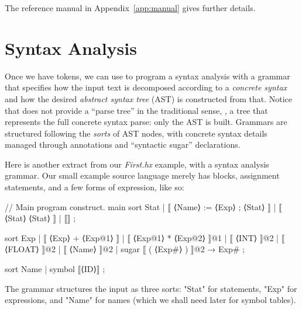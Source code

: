\documentclass[11pt]{article} %
\begin{document}
The reference manual in Appendix~\ref{app:manual} gives further details.


\section{Syntax Analysis}
\label{sec:syntax}

Once we have tokens, we can use \HAX to program a syntax analysis with a grammar that specifies how
the input text is decomposed according to a \emph{concrete syntax} and how the desired
\emph{abstract syntax tree} (AST) is constructed from that. Notice that \HAX does not provide a
``parse tree'' in the traditional sense, \ie, a tree that represents the full concrete syntax parse:
only the AST is built.  Grammars are structured following the \emph{sorts} of AST nodes, with
concrete syntax details managed through annotations and ``syntactic sugar'' declarations.

\begin{example}\label{ex:syntax}
  Here is another extract from our \emph{First.hx} example, with a syntax analysis grammar. Our
  small example source language merely has blocks, assignment statements, and a few forms of
  expression, like so:
\begin{hacs}[xleftmargin=\parindent,xrightmargin=\parindent,numbers=right]
// Main program construct.
main sort Stat  | ⟦ ⟨Name⟩ := ⟨Exp⟩ ; ⟨Stat⟩ ⟧
                | ⟦ { ⟨Stat⟩ } ⟨Stat⟩ ⟧
                | ⟦⟧ ;

sort Exp  | ⟦ ⟨Exp⟩ + ⟨Exp@1⟩ ⟧
          | ⟦ ⟨Exp@1⟩ * ⟨Exp@2⟩ ⟧@1
          | ⟦ ⟨INT⟩ ⟧@2
          | ⟦ ⟨FLOAT⟩ ⟧@2
          | ⟦ ⟨Name⟩ ⟧@2
          | sugar ⟦ ( ⟨Exp#⟩ ) ⟧@2 → Exp# ;

sort Name | symbol ⟦⟨ID⟩⟧ ;
\end{hacs}
  The grammar structures the input as three sorts: "Stat" for statements, "Exp" for expressions, and
  "Name" for names (which we shall need later for symbol tables).
\end{example}
\end{document}
